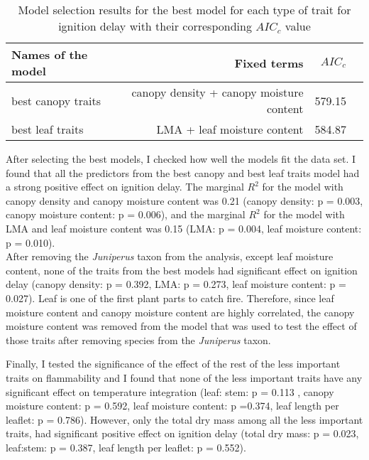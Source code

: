 \documentclass[12pt]{report}
\begin{document}
\begin{table}
\centering
\begin{tabular}{lrrr}
       \hline
       \textbf{ Names of the model} & \textbf{Fixed terms} & \textbf{$AIC_{c}$} \\
       \hline
        best canopy traits  & canopy density +  canopy moisture content &  579.15 \\
       \hline
        best leaf traits    & LMA +  leaf moisture content &  584.87 \\
       \hline
\end{tabular}
\caption{Model selection results for the best model for each type of trait for ignition delay with their corresponding $AIC_{c}$ value}
\end{table} 


After selecting the best models, I checked how well the models fit the data set. I found that all the predictors from the best canopy and best leaf traits model had a strong positive effect on ignition delay. The marginal $R^2$ for the model with canopy density and canopy moisture content was 0.21 (canopy density: p = 0.003, canopy moisture content: p = 0.006), and the marginal $R^2$ for the model with LMA and leaf moisture content was 0.15 (LMA: p = 0.004, leaf moisture content: p = 0.010). \\

After removing the \emph{Juniperus} taxon from the analysis, except leaf moisture content, none of the traits from the best models had significant effect on ignition delay (canopy density: p = 0.392,
LMA: p = 0.273, leaf moisture content: p = 0.027). Leaf is one of the first plant parts to catch fire.
Therefore, since leaf moisture content and canopy moisture content are highly correlated, the canopy moisture content was removed from the model that was used to test the effect of those traits after removing species from the \emph{Juniperus} taxon.



Finally, I tested the significance of the effect of the rest of the less important traits on flammability and I found that none of the less important traits have any significant effect on temperature integration (leaf: stem: p = 0.113 , canopy moisture content: p = 0.592, leaf moisture content: p =0.374, leaf length per leaflet: p = 0.786). However, only the total dry mass among all the less important traits, had significant positive effect on ignition delay (total dry mass: p = 0.023, leaf:stem: p = 0.387, leaf length per leaflet: p = 0.552).
\end{document}
